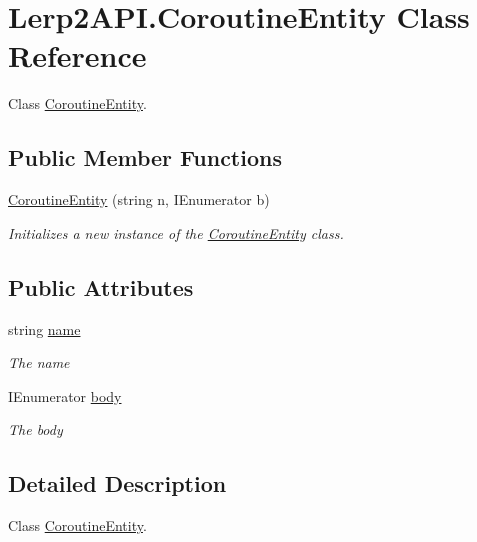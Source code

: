 \hypertarget{class_lerp2_a_p_i_1_1_coroutine_entity}{}\section{Lerp2\+A\+P\+I.\+Coroutine\+Entity Class Reference}
\label{class_lerp2_a_p_i_1_1_coroutine_entity}


Class \hyperlink{class_lerp2_a_p_i_1_1_coroutine_entity}{Coroutine\+Entity}.  


\subsection*{Public Member Functions}
\begin{DoxyCompactItemize}
\item 
\hyperlink{class_lerp2_a_p_i_1_1_coroutine_entity_ab25292f23b6ac11c0308b63dfaa3248d}{Coroutine\+Entity} (string n, I\+Enumerator b)
\begin{DoxyCompactList}\small\item\em Initializes a new instance of the \hyperlink{class_lerp2_a_p_i_1_1_coroutine_entity}{Coroutine\+Entity} class. \end{DoxyCompactList}\end{DoxyCompactItemize}
\subsection*{Public Attributes}
\begin{DoxyCompactItemize}
\item 
string \hyperlink{class_lerp2_a_p_i_1_1_coroutine_entity_ad0f1956413a51bfb0f84dc5700e370c5}{name}
\begin{DoxyCompactList}\small\item\em The name \end{DoxyCompactList}\item 
I\+Enumerator \hyperlink{class_lerp2_a_p_i_1_1_coroutine_entity_a8222c08002c9acac83565f51135012bb}{body}
\begin{DoxyCompactList}\small\item\em The body \end{DoxyCompactList}\end{DoxyCompactItemize}


\subsection{Detailed Description}
Class \hyperlink{class_lerp2_a_p_i_1_1_coroutine_entity}{Coroutine\+Entity}. 



